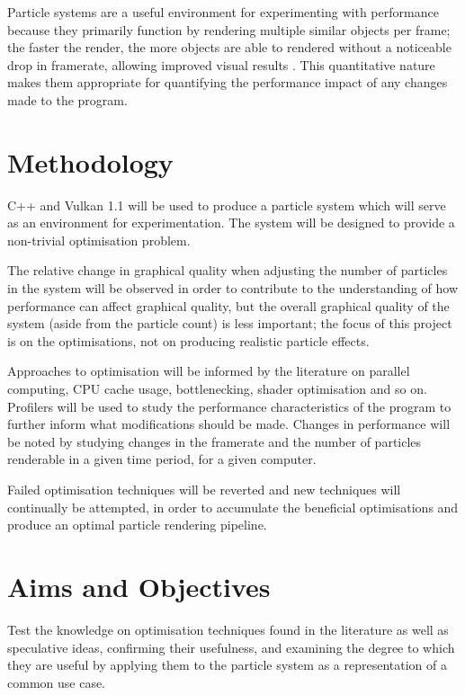 \documentclass[10pt, a4paper, twocolumn]{article}
\begin{document}
Particle systems are a useful environment for experimenting with performance because they primarily function by rendering multiple similar objects per frame; the faster the render, the more objects are able to rendered without a noticeable drop in framerate, allowing improved visual results \citep{Beeckler2008}. This quantitative nature makes them appropriate for quantifying the performance impact of any changes made to the program.






\section{Methodology}
C++ and Vulkan 1.1 will be used to produce a particle system which will serve as an environment for experimentation. The system will be designed to provide a non-trivial optimisation problem.

The relative change in graphical quality when adjusting the number of particles in the system will be observed in order to contribute to the understanding of how performance can affect graphical quality, but the overall graphical quality of the system (aside from the particle count) is less important; the focus of this project is on the optimisations, not on producing realistic particle effects.

Approaches to optimisation will be informed by the literature on parallel computing, CPU cache usage, bottlenecking, shader optimisation and so on. Profilers will be used to study the performance characteristics of the program to further inform what modifications should be made. Changes in performance will be noted by studying changes in the framerate and the number of particles renderable in a given time period, for a given computer.

Failed optimisation techniques will be reverted and new techniques will continually be attempted, in order to accumulate the beneficial optimisations and produce an optimal particle rendering pipeline.






\section{Aims and Objectives}
Test the knowledge on optimisation techniques found in the literature as well as speculative ideas, confirming their usefulness, and examining the degree to which they are useful by applying them to the particle system as a representation of a common use case.




\end{document}
